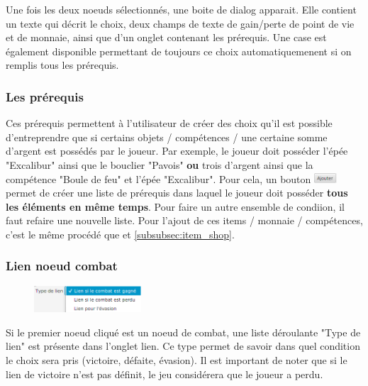 			Une fois les deux noeuds sélectionnés, une boite de dialog apparait. Elle contient un texte qui décrit le choix, deux champs de texte de gain/perte de point de vie et de monnaie, ainsi que d'un onglet contenant les prérequis. Une case est également disponible permettant de toujours ce choix automatiquemenent si on remplis tous les prérequis.

			\subsubsection{Les prérequis}
				\label{sec:prerequis}

				Ces prérequis permettent à l'utilisateur de créer des choix qu'il est possible d'entreprendre que si certains objets / compétences / une certaine somme d'argent est possédés par le joueur. Par exemple, le joueur doit posséder l'épée "Excalibur" ainsi que le bouclier "Pavois" \textbf{ou} trois d'argent ainsi que la compétence "Boule de feu" et l'épée "Excalibur". Pour cela, un bouton \includegraphics[height=10pt, keepaspectratio]{img/ajouterBouton.png} permet de créer une liste de prérequis dans laquel le joueur doit posséder \textbf{tous les éléments en même temps}. Pour faire un autre ensemble de condiion, il faut refaire une nouvelle liste.
				Pour l'ajout de ces items / monnaie / compétences, c'est le même procédé que  et \ref{subsubsec:item_shop}.

			\subsubsection{Lien noeud combat}
				\label{subsubsec:lienCombat}

				\begin{figure}
					\centering\includegraphics[width=4cm, keepaspectratio]{img/lienCombat.png}
				\end{figure}
				Si le premier noeud cliqué est un noeud de combat, une liste déroulante "Type de lien" est présente dans l'onglet lien. Ce type permet de savoir dans quel condition le choix sera pris (victoire, défaite, évasion). Il est important de noter que si le lien de victoire n'est pas définit, le jeu considérera que le joueur a perdu.

